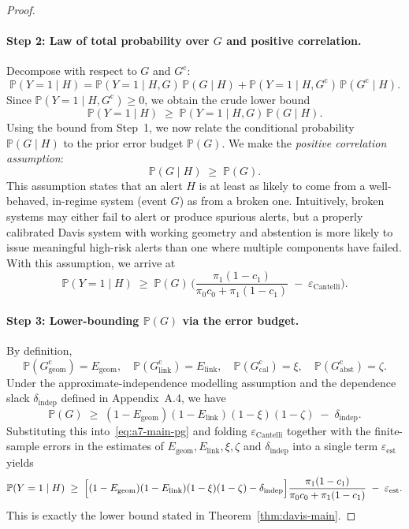 \documentclass[11pt]{article}
\begin{document}
\begin{proof}
\paragraph{Step 2: Law of total probability over $G$ and positive correlation.}
Decompose with respect to $G$ and $G^{\mathrm{c}}$:
\[
\mathbb{P}(Y = 1 \mid H)
=
\mathbb{P}(Y = 1 \mid H, G)\,\mathbb{P}(G \mid H)
+
\mathbb{P}(Y = 1 \mid H, G^{\mathrm{c}})\,\mathbb{P}(G^{\mathrm{c}} \mid H).
\]
Since $\mathbb{P}(Y = 1 \mid H, G^{\mathrm{c}}) \ge 0$, we obtain the crude lower bound
\begin{equation}
\mathbb{P}(Y = 1 \mid H)
\;\ge\;
\mathbb{P}(Y = 1 \mid H, G)\,\mathbb{P}(G \mid H).
\label{eq:a7-ltp}
\end{equation}
Using the bound from Step~1, we now relate the conditional probability
$\mathbb{P}(G \mid H)$ to the prior error budget $\mathbb{P}(G)$. We make
the \emph{positive correlation assumption}:
\begin{equation}
\mathbb{P}(G \mid H) \;\ge\; \mathbb{P}(G).
\label{eq:positive-correlation}
\end{equation}
This assumption states that an alert $H$ is at least as likely to come from
a well-behaved, in-regime system (event $G$) as from a broken one. Intuitively,
broken systems may either fail to alert or produce spurious alerts, but a properly
calibrated Davis system with working geometry and abstention is more likely to
issue meaningful high-risk alerts than one where multiple components have failed.
With this assumption, we arrive at
\begin{equation}
\mathbb{P}(Y = 1 \mid H)
\;\ge\;
\mathbb{P}(G)\,
\Biggl(
\frac{\pi_1(1 - c_1)}{\pi_0 c_0 + \pi_1(1 - c_1)}
\;-\; \varepsilon_{\mathrm{Cantelli}}
\Biggr).
\label{eq:a7-main-pg}
\end{equation}

\paragraph{Step 3: Lower-bounding $\mathbb{P}(G)$ via the error budget.}
By definition,
\[
\mathbb{P}(G^{\mathrm{c}}_{\mathrm{geom}}) = E_{\mathrm{geom}},\quad
\mathbb{P}(G^{\mathrm{c}}_{\mathrm{link}}) = E_{\mathrm{link}},\quad
\mathbb{P}(G^{\mathrm{c}}_{\mathrm{cal}}) = \xi,\quad
\mathbb{P}(G^{\mathrm{c}}_{\mathrm{abst}}) = \zeta.
\]
Under the approximate-independence modelling assumption and the dependence
slack $\delta_{\mathrm{indep}}$ defined in Appendix~A.4, we have
\[
\mathbb{P}(G)
\;\ge\;
(1 - E_{\mathrm{geom}})(1 - E_{\mathrm{link}})(1 - \xi)(1 - \zeta)
\;-\; \delta_{\mathrm{indep}}.
\]
Substituting this into~\eqref{eq:a7-main-pg} and folding
$\varepsilon_{\mathrm{Cantelli}}$ together with the finite-sample errors in the
estimates of $E_{\mathrm{geom}}, E_{\mathrm{link}}, \xi, \zeta$ and $\delta_{\mathrm{indep}}$
into a single term $\varepsilon_{\mathrm{est}}$ yields
\[
\mathbb{P}(Y = 1 \mid H)
\;\ge\;
\Bigl[
(1 - E_{\mathrm{geom}})(1 - E_{\mathrm{link}})(1 - \xi)(1 - \zeta)
- \delta_{\mathrm{indep}}
\Bigr]
\frac{\pi_1(1 - c_1)}{\pi_0 c_0 + \pi_1(1 - c_1)}
\;-\; \varepsilon_{\mathrm{est}}.
\]
This is exactly the lower bound stated in Theorem~\ref{thm:davis-main}.
\end{proof}
\end{document}
